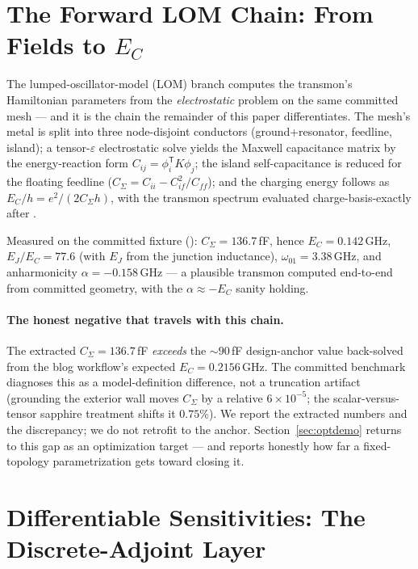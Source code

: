 \documentclass{anvil-paper}
\begin{document}
\section{The Forward LOM Chain: From Fields to \texorpdfstring{$E_C$}{E\_C}}
\label{sec:lom}

The lumped-oscillator-model (LOM) branch computes the transmon's
Hamiltonian parameters from the \emph{electrostatic} problem on the same
committed mesh --- and it is the chain the remainder of this paper
differentiates. The mesh's metal is split into three node-disjoint
conductors (ground+resonator, feedline, island); a tensor-$\varepsilon$
electrostatic solve yields the Maxwell capacitance matrix by the
energy-reaction form $C_{ij} = \phi_i^{\mathsf{T}} K \phi_j$; the island
self-capacitance is reduced for the floating feedline
($C_\Sigma = C_{ii} - C_{if}^2/C_{ff}$); and the charging energy follows
as $E_C/h = e^2/(2 C_\Sigma h)$, with the transmon spectrum evaluated
charge-basis-exactly after \citet{koch2007}.

Measured on the committed fixture
(): $C_\Sigma =
136.7$\,fF, hence $E_C = 0.142$\,GHz, $E_J/E_C = 77.6$ (with $E_J$ from
the junction inductance), $\omega_{01} = 3.38$\,GHz, and anharmonicity
$\alpha = -0.158$\,GHz --- a plausible transmon computed end-to-end from
committed geometry, with the $\alpha \approx -E_C$ sanity holding.

\paragraph{The honest negative that travels with this chain.}
The extracted $C_\Sigma = 136.7$\,fF \emph{exceeds} the ${\sim}90$\,fF
design-anchor value back-solved from the blog workflow's expected
$E_C = 0.2156$\,GHz. The committed benchmark diagnoses this as a
model-definition difference, not a truncation artifact (grounding the
exterior wall moves $C_\Sigma$ by a relative $6\times10^{-5}$; the
scalar-versus-tensor sapphire treatment shifts it $0.75\%$). We report
the extracted numbers and the discrepancy; we do not retrofit to the
anchor. Section~\ref{sec:optdemo} returns to this gap as an optimization
target --- and reports honestly how far a fixed-topology parametrization
gets toward closing it.

\section{Differentiable Sensitivities: The Discrete-Adjoint Layer}
\label{sec:adjoint}
\end{document}
